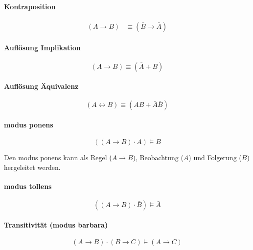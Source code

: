 \documentclass[../main.tex]{subfiles}
\begin{document}
        \paragraph{Kontraposition}
            \begin{align}
                (A \rightarrow B) &\equiv (\bar{B} \rightarrow \bar{A})
            \end{align}
        
        \paragraph{Auflösung Implikation}
            \begin{equation}
                (A \rightarrow B) \equiv (\bar{A} + B)
            \end{equation}
        
        \paragraph{Auflösung Äquivalenz}
            \begin{equation}
                (A \leftrightarrow B) \equiv (AB + \bar{A}\bar{B})
            \end{equation}
        
        \paragraph{modus ponens}
            \begin{equation}
                ((A \rightarrow B) \cdot A) \models B
            \end{equation}
            
            Den modus ponens kann als Regel ($A \rightarrow B$), Beobachtung ($A$) und Folgerung ($B$) hergeleitet werden.
        
        \paragraph{modus tollens}
            \begin{equation}
                ((A \rightarrow B) \cdot \bar{B}) \models \bar{A}
            \end{equation}
        
        \paragraph{Transitivität (modus barbara)}
            \begin{equation}
                (A \rightarrow B) \cdot (B \rightarrow C) \models (A \rightarrow C)
            \end{equation}
\end{document}

